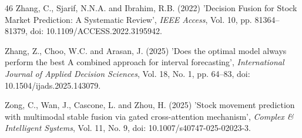 \documentclass{singlecol-new}
\theoremstyle{TH}{
\newtheorem{lemma}{Lemma}
\newtheorem{theorem}[lemma]{Theorem}
\newtheorem{corrolary}[lemma]{Corrolary}
\newtheorem{conjecture}[lemma]{Conjecture}
\newtheorem{proposition}[lemma]{Proposition}
\newtheorem{claim}[lemma]{Claim}
\newtheorem{stheorem}[lemma]{Wrong Theorem}
\newtheorem{algorithm}{Algorithm}
}
\theoremstyle{THrm}{
\newtheorem{definition}{Definition}[section]
\newtheorem{question}{Question}[section]
\newtheorem{remark}{Remark}
\newtheorem{scheme}{Scheme}
}
\theoremstyle{THhit}{
\newtheorem{case}{Case}[section]
}
\begin{document}
\begin{thebibliography}{46}
Zhang, C., Sjarif, N.N.A. and Ibrahim, R.B. (2022) 'Decision Fusion for Stock Market Prediction: A Systematic Review', {\it IEEE Access}, Vol. 10, pp. 81364--81379, doi: 10.1109/ACCESS.2022.3195942.

Zhang, Z., Choo, W.C. and Arasan, J. (2025) 'Does the optimal model always perform the best A combined approach for interval forecasting', {\it International Journal of Applied Decision Sciences}, Vol. 18, No. 1, pp. 64--83, doi: 10.1504/ijads.2025.143079.

Zong, C., Wan, J., Cascone, L. and Zhou, H. (2025) 'Stock movement prediction with multimodal stable fusion via gated cross-attention mechanism', {\it Complex \& Intelligent Systems}, Vol. 11, No. 9, doi: 10.1007/s40747-025-02023-3.

\end{thebibliography}
\end{document}
